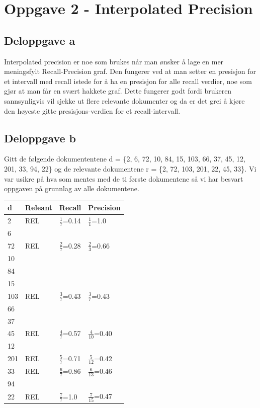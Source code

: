 \section*{Oppgave 2 - Interpolated Precision}
\subsection*{Deloppgave a}
Interpolated precision er noe som brukes når man ønsker å lage en mer meningsfylt Recall-Precision graf. Den fungerer ved at man setter en presisjon for et intervall med recall istede for å ha en presisjon for alle recall verdier, noe som gjør at man får en svært hakkete graf. Dette fungerer godt fordi brukeren sannsynligvis vil sjekke ut flere relevante dokumenter og da er det grei å kjøre den høyeste gitte presisjons-verdien for et recall-intervall.

\pagebreak
\subsection*{Deloppgave b}

Gitt de følgende dokumententene d = \{2, 6, 72, 10, 84, 15, 103, 66, 37, 45, 12, 201, 33, 94, 22\}
og de relevante dokumentene r = \{2, 72, 103, 201, 22, 45, 33\}.
Vi var usikre på hva som mentes med de ti første dokumentene så vi har besvart oppgaven på grunnlag av alle dokumentene.
\begin{center}
    \begin{tabular}{| l | l | l | l |}
    \hline
    d & Releant & Recall & Precision \\ \hline
    2 & REL & $\frac{1}{7}$=0.14& $\frac{1}{1}$=1.0 \\ \hline
    6 &  &  & \\ \hline
    72 & REL & $\frac{2}{7}$=0.28 & $\frac{2}{3}$=0.66 \\ \hline
    10 &  &  & \\ \hline
    84 &  &  & \\ \hline
    15 &  &  & \\ \hline
    103 & REL & $\frac{3}{7}$=0.43 & $\frac{3}{7}$=0.43 \\ \hline
    66 &  &  & \\ \hline
    37 &  &  & \\ \hline
    45 & REL & $\frac{4}{7}$=0.57 & $\frac{4}{10}$=0.40 \\ \hline
    12 &  &  & \\ \hline
    201 & REL & $\frac{5}{7}$=0.71 & $\frac{5}{12}$=0.42 \\ \hline
    33 & REL & $\frac{6}{7}$=0.86 & $\frac{6}{13}$=0.46 \\ \hline
    94 &  &  & \\ \hline
    22 & REL & $\frac{7}{7}$=1.0 & $\frac{7}{15}$=0.47 \\ \hline
    \end{tabular}
\end{center}


